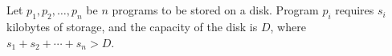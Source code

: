 \documentclass[paper=a4, fontsize=11pt]{scrartcl} %
\begin{document}
\maketitle %

\section{}

\begin{fancyquotes}
  Let $p_1,p_2,\ldots,p_n$ be $n$ programs to be stored on a
  disk. Program $p_i$ requires $s_i$ kilobytes of storage, and the
  capacity of the disk is $D$, where $s_1+s_2+\cdots+s_n > D$.
\end{fancyquotes}
\end{document}
